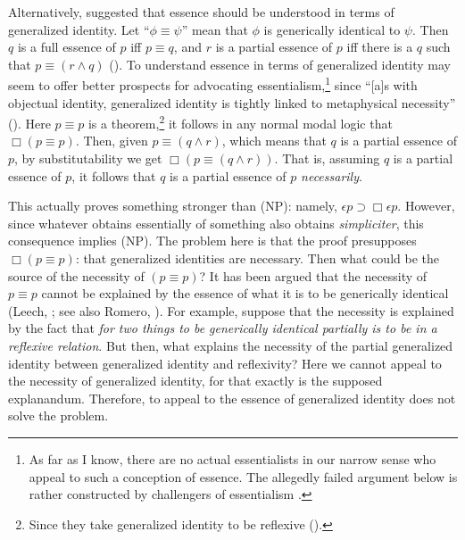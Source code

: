 \documentclass[12pt]{article}
\begin{document}
\par 
Alternatively, \citet{Correia2017-CORGEA} suggested that essence should be understood in terms of generalized identity. Let ``$\phi \equiv \psi$'' mean that $\phi$ is generically identical to $\psi$. Then $q$ is a full essence of $p$ iff $p \equiv q$, and $r$ is a partial essence of $p$ iff there is a $q$ such that $p \equiv (r \land q)$ (\citeyear[649--50]{Correia2017-CORGEA}). To understand essence in terms of generalized identity may seem to offer better prospects for advocating essentialism,\footnote{As far as I know, there are no actual essentialists in our narrow sense who appeal to such a conception of essence. The allegedly failed argument below is rather constructed by challengers of essentialism \citep{Romero2019-ROMMIN,Leech2021-LEEFET-2}.} since ``[a]s with objectual identity, generalized identity is tightly linked to metaphysical necessity'' (\citeyear[656]{Correia2017-CORGEA}). Here $p \equiv p$ is a theorem,\footnote{Since they take generalized identity to be reflexive (\citeyear[645]{Correia2017-CORGEA}).} it follows in any normal modal logic that $\Box (p \equiv p)$. Then, given $p \equiv (q \land r)$, which means that $q$ is a partial essence of $p$, by substitutability we get $\Box (p \equiv (q \land r))$. That is, assuming $q$ is a partial essence of $p$, it follows that $q$ is a partial essence of $p$ \textit{necessarily}.
\par
This actually proves something stronger than (NP): namely, $\epsilon p \supset \Box \epsilon p$. However, since whatever obtains essentially of something also obtains \textit{simpliciter}, this consequence implies (NP). The problem here is that the proof presupposes $\Box (p \equiv p)$: that generalized identities are necessary. Then what could be the source of the necessity of $(p \equiv p)$? It has been argued that the necessity of $p \equiv p$ cannot be explained by the essence of what it is to be generically identical (Leech, \citeyear[901--2]{Leech2021-LEEFET-2}; see also Romero, \citeyear[138]{Romero2019-ROMMIN}). For example, suppose that the necessity is explained by the fact that \textit{for two things to be generically identical partially is to be in a reflexive relation}. But then, what explains the necessity of the partial generalized identity between generalized identity and reflexivity? Here we cannot appeal to the necessity of generalized identity, for that exactly is the supposed explanandum. Therefore, to appeal to the essence of generalized identity does not solve the problem.
\par
\end{document}
